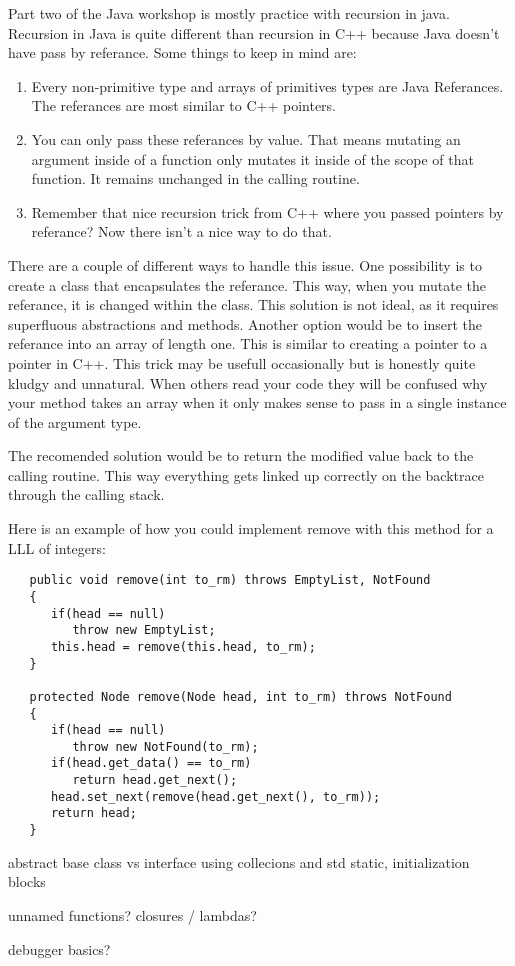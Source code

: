 \documentclass[../../main.tex]{subfiles}
\begin{document}
Part two of the Java workshop is mostly practice with recursion in java. Recursion in Java is quite
different than recursion in C++ because Java doesn't have pass by referance.
Some things to keep in mind are:
   \begin{enumerate}[label=\Alph*.]
         \item Every non-primitive type and arrays of primitives types are Java Referances. The referances
            are most similar to C++ pointers.
         \item You can only pass these referances by value. That means mutating an argument inside of
            a function only mutates it inside of the scope of that function. It remains unchanged in
            the calling routine.
         \item Remember that nice recursion trick from C++ where you passed pointers by referance? Now
            there isn't a nice way to do that.
   \end{enumerate}

There are a couple of different ways to handle this issue. One possibility is to create a class that
encapsulates the referance. This way, when you mutate the referance, it is changed within the class.
This solution is not ideal, as it requires superfluous abstractions and methods. Another option would
be to insert the referance into an array of length one. This is similar to creating a pointer to a pointer
in C++. This trick may be usefull occasionally but is honestly quite kludgy and unnatural. When others
read your code they will be confused why your method takes an array when it only makes sense to pass in a
single instance of the argument type.

The recomended solution would be to return the modified value back to the calling routine. This way
everything gets linked up correctly on the backtrace through the calling stack.

Here is an example of how you could implement remove with this method for a LLL of integers:

\begin{verbatim}
   public void remove(int to_rm) throws EmptyList, NotFound
   {
      if(head == null)
         throw new EmptyList;
      this.head = remove(this.head, to_rm);
   }

   protected Node remove(Node head, int to_rm) throws NotFound
   {
      if(head == null)
         throw new NotFound(to_rm);
      if(head.get_data() == to_rm)
         return head.get_next();
      head.set_next(remove(head.get_next(), to_rm));
      return head;
   }
\end{verbatim}

abstract base class vs interface
using collecions and std
static, initialization blocks

unnamed functions? closures / lambdas?

debugger basics?
\end{document}
